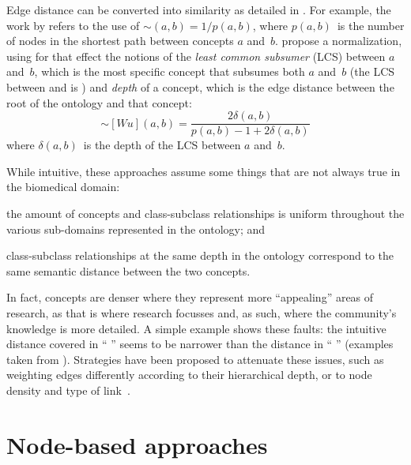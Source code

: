 Edge distance can be converted into similarity as detailed in . For example, the work by \citet{Pedersen2007} refers to the use of $\sim(a,b) = 1 / p(a,b)$, where $p(a,b)$~is the number of nodes in the shortest path between concepts $a$ and~$b$. \citet{Wu1994} propose a normalization, using for that effect the notions of the \emph{least common subsumer} (LCS) between $a$ and~$b$, which is the most specific concept that subsumes both $a$ and~$b$ (\eg the LCS between  and  is ) and \emph{depth} of a concept, which is the edge distance between the root of the ontology and that concept:
\begin{equation}
    \sim[Wu](a,b) = \frac{2\delta(a,b)}{p(a,b) - 1 + 2\delta(a,b)}
    \label{eq:wu}
\end{equation}
where $\delta(a,b)$~is the depth of the LCS between $a$ and~$b$.

While intuitive, these approaches assume some things that are not always true in the biomedical domain:
\begin{paralist}
    \item the amount of concepts and class-subclass relationships is uniform throughout the various sub-domains represented in the ontology; and
    \item class-subclass relationships at the same depth in the ontology correspond to the same semantic distance between the two concepts.
\end{paralist}
In fact, concepts are denser where they represent more ``appealing'' areas of research, as that is where research focusses and, as such, where the community's knowledge is more detailed. A simple example shows these faults: the intuitive distance covered in ``  '' seems to be narrower than the distance in ``  '' (examples taken from ). Strategies have been proposed to attenuate these issues, such as weighting edges differently according to their hierarchical depth, or to node density and type of link~\citep{Pesquita2009}.


\section{Node-based approaches} \label{sec:sota/node}

